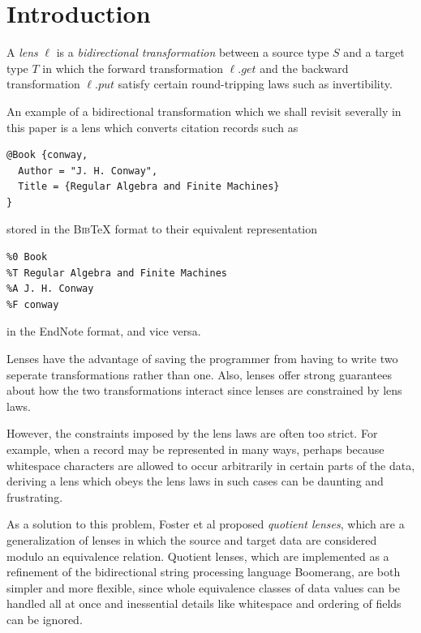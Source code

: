 \documentclass{svproc}
\newcommand{\bibtex}{\textsc{Bib}\TeX{}}
\newcommand{\get}{\ensuremath{\mathit{get}}}
\newcommand{\lput}{\ensuremath{\mathit{put}}}
\begin{document}
\section{Introduction}
A {\em lens} $\ell$ is a {\em bidirectional transformation} between a source
type $S$ and a target type $T$ in which the forward transformation
$\ell.\get$ and the backward transformation $\ell.\lput$ satisfy certain
round-tripping laws such as invertibility.

An example of a bidirectional transformation which we shall revisit
severally in this paper is a lens which converts citation records such as
\begin{verbatim}
@Book {conway,
  Author = "J. H. Conway",
  Title = {Regular Algebra and Finite Machines}
}
\end{verbatim}

\noindent stored in the \bibtex{} format to their equivalent representation 
\begin{verbatim}
%0 Book
%T Regular Algebra and Finite Machines
%A J. H. Conway
%F conway
\end{verbatim}

\noindent in the EndNote format, and vice versa.

Lenses have the advantage of saving the programmer from having to
write two seperate transformations rather than one. Also, lenses offer strong
guarantees about how the two transformations interact since lenses are
constrained by lens laws. 

However, the constraints imposed by the lens laws are often too strict. For
example, when a record may be represented in many ways, perhaps because
whitespace characters are allowed to occur arbitrarily in certain parts of the
data, deriving a lens which obeys the lens laws in such cases can be daunting
and frustrating.

As a solution to this problem, Foster et al proposed {\em quotient lenses},
which are a generalization of lenses in which the source and target data are
considered modulo an equivalence relation. Quotient lenses, which are
implemented as a refinement of the bidirectional string processing language
Boomerang, are both simpler and more flexible, since whole equivalence classes
of data values can be handled all at once and inessential details like
whitespace and ordering of fields can be ignored.
\end{document}
